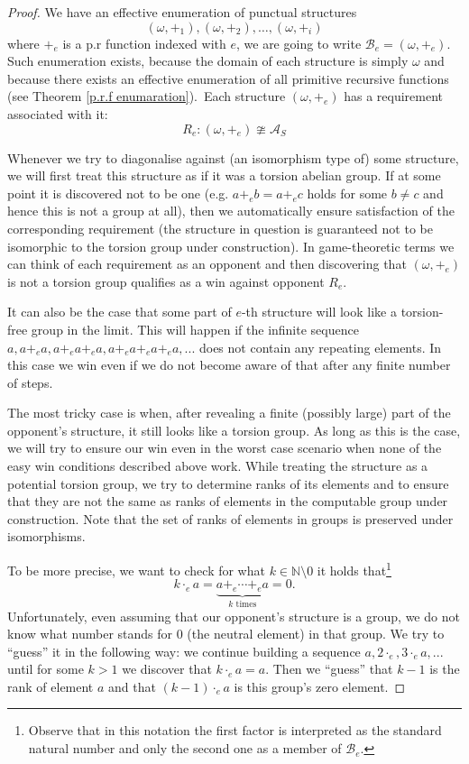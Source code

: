 \documentclass{pracalicmgr2025}
\theoremstyle{plain}            %
\theoremstyle{remark}           %
\theoremstyle{definition}       %
\begin{document}
\begin{proof}
We have an effective enumeration of punctual structures
$$(\omega, +_1), (\omega,+_2),\dots,(\omega,+_i)$$
where $+_e$ is a p.r function indexed with $e$, we are going to write $\mathcal{B}_e = (\omega,+_e)$. Such enumeration exists, because the domain of each structure is simply $\omega$ and because there exists an effective enumeration of all primitive recursive functions (see Theorem \ref{p.r.f enumaration}).\ Each structure $(\omega, +_e)$ has a requirement associated with it:
$$R_e: (\omega, +_e) \ncong \mathcal{A}_S$$


Whenever we try to diagonalise against (an isomorphism type of) some structure, we will first treat this structure as if it was a torsion abelian group. If at some point it is discovered not to be one (e.g. $a +_e b = a +_e c$ holds for some $b \neq c$ and hence this is not a group at all), then we automatically ensure satisfaction of the corresponding requirement (the structure in question is guaranteed not to be isomorphic to the torsion group under construction). In game-theoretic terms we can think of each requirement as an opponent and then discovering that $(\omega, +_e)$ is not a torsion group qualifies as a win against opponent $R_e$.


It can also be the case that some part of $e$-th structure will look like a torsion-free group in the limit. This will happen if the infinite sequence $a, a +_e a, a +_e a +_ea, a +_e a +_e a+_ea, ...$ does not contain  any repeating elements. In this case we win even if we do not become aware of that after any finite number of steps.


The most tricky case is when, after revealing a finite (possibly large) part of the opponent’s structure, it still looks like a torsion group. As long as this is the case, we will try to ensure our win even in the worst case scenario when none of the easy win conditions described above work. While treating the structure as a potential torsion group, we try to determine ranks of its elements and to ensure that they are not the same as ranks of elements in the computable group under construction. Note that the set of ranks of elements in groups is preserved under isomorphisms.


To be more precise, we want to check for what $k \in \mathbb{N} \setminus {0}$ it holds that\footnote{Observe that in this notation the first factor is interpreted as the standard natural number and only the second one as a member of $\mathcal{B}_e$.}
$$k \cdot_e a = \underbrace{a +_e \cdots +_e a}_{k \text{ times}} = 0.$$  
Unfortunately, even assuming that our opponent’s structure is a group, we do not know what number stands for $0$ (the neutral element) in that group. We try to “guess” it in the following way: we continue building  a sequence  $a, 2 \cdot_e, 3 \cdot_e a, ...$ until for some $k>1$ we discover that $k \cdot_e a = a$. Then we “guess” that $k-1$ is the rank of element $a$ and that $(k-1) \cdot_e a$ is this group’s zero element.



\end{proof}
\end{document}
